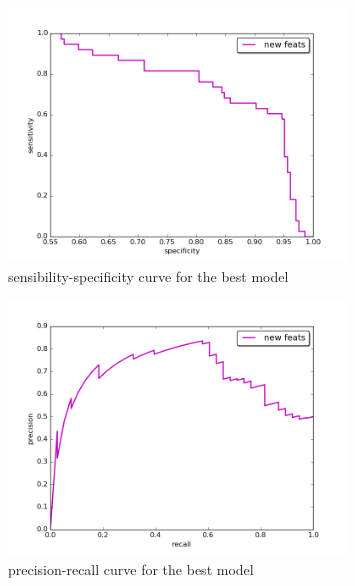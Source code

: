 \documentclass{article}
\begin{document}
\begin{figure}[!h]
	\centering
	\includegraphics[width= 0.8\textwidth]{sensibility_specificity.png}
	\caption{sensibility-specificity curve for the best model}
	\label{fig:sensibility_specificity_best}
\end{figure}

\begin{figure}[!h]
	\centering
	\includegraphics[width= 0.8\textwidth]{precision_recall.png}
	\caption{precision-recall curve for the best model}
	\label{fig:precision_recall_best}
\end{figure}
\end{document}
